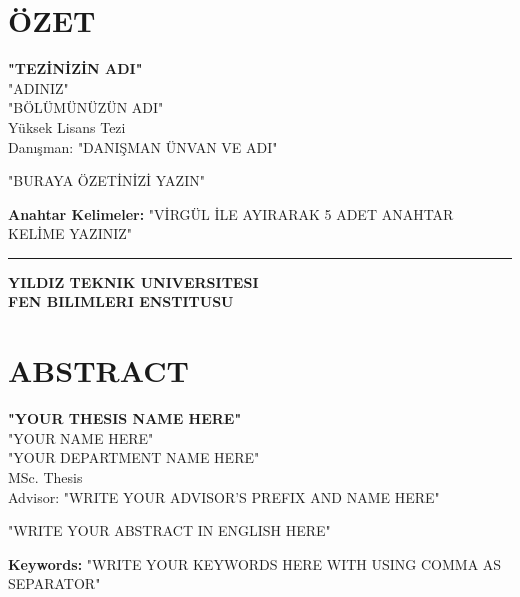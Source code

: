 \documentclass[12pt]{report}
\begin{document}
\chapter*{\"{O}ZET}
\vspace{-30pt}
\begin{center}
\uppercase{\large{\bfseries{"TEZİNİZİN ADI"}}}\\[1cm]

"ADINIZ"\\[1cm]

"BÖLÜMÜNÜZÜN ADI"\\
Yüksek Lisans Tezi\\[1cm] %

Danışman: "DANIŞMAN ÜNVAN VE ADI"\\[1cm]
\end{center}

\begin{singlespacing}
"BURAYA ÖZETİNİZİ YAZIN"

\vspace{2.5cm}
\textbf{Anahtar Kelimeler:} "VİRGÜL İLE AYIRARAK 5 ADET ANAHTAR KELİME YAZINIZ"
\end{singlespacing}

\vspace{1ex}
\hrule
\begin{flushright}
\textbf{YILDIZ TEKNIK UNIVERSITESI \\ FEN BILIMLERI ENSTITUSU}
\end{flushright}

\chapter*{ABSTRACT}
\vspace{-30pt}
\begin{center}
\uppercase{\large{\bfseries{"YOUR THESIS NAME HERE"}}}\\[1cm]

"YOUR NAME HERE"\\[1cm]

"YOUR DEPARTMENT NAME HERE"\\
MSc. Thesis\\[1cm] %

Advisor: "WRITE YOUR ADVISOR'S PREFIX AND NAME HERE"\\[1cm]
\end{center}

\begin{singlespacing}
"WRITE YOUR ABSTRACT IN ENGLISH HERE"

\vspace{3cm}
\textbf{Keywords:} "WRITE YOUR KEYWORDS HERE WITH USING COMMA AS SEPARATOR"
\end{singlespacing}
\end{document}
